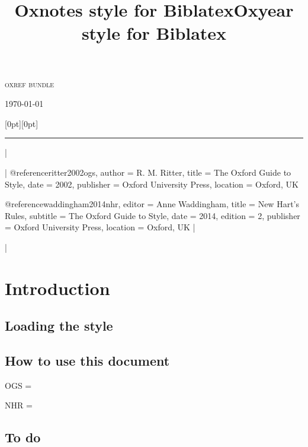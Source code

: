 \documentclass[extrafontsizes,11pt,a4paper,oneside]{memoir}
\title{Oxnotes style for Biblatex}|
\title{Oxyear style for Biblatex}|
\begin{document}
\thispagestyle{empty}
\begin{adjustwidth}{.2\textwidth}{0pt}
  \sffamily\setlength{\parindent}{0pt}%
  \LARGE\textsc{oxref bundle}
  
  \LARGE\thetitle
  
  \bigskip
  \Large\theauthor
  
  \bigskip
  \Large\ifx\undefined\thedate\today\else\thedate\fi
\end{adjustwidth}

\noindent
\hspace*{.1\textwidth}\raisebox{0pt}[0pt][0pt]{\rule{\normalrulethickness}{\textheight}}

\newpage
\tableofcontents*
|


\todoc[src]|
@reference{ritter2002ogs,
  author = {R. M. Ritter},
  title = {The {Oxford} Guide to Style},
  date = {2002},
  publisher = {Oxford University Press},
  location = {Oxford, UK}
}

@reference{waddingham2014nhr,
  editor = {Anne Waddingham},
  title = {New {Hart's} Rules},
  subtitle = {The {Oxford} Guide to Style},
  date = {2014},
  edition = {2},
  publisher = {Oxford University Press},
  location = {Oxford, UK}
}
|

\todoc|
\chapter{Introduction}

\section{Loading the style}

\section{How to use this document}

OGS = 

NHR = 

\section{To do}
\end{document}
